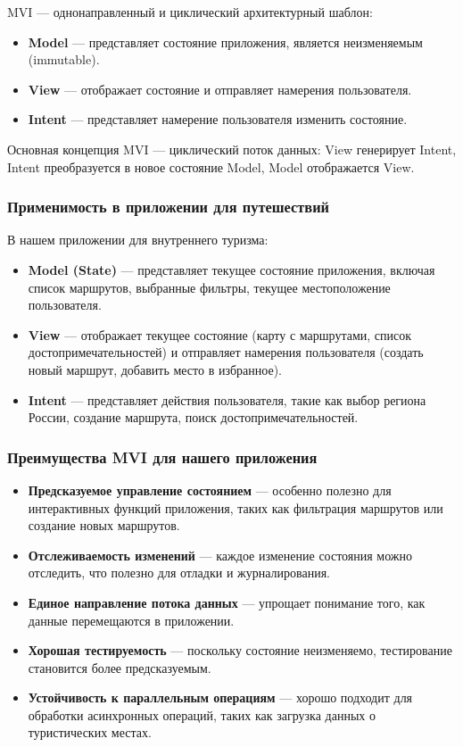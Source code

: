 MVI — однонаправленный и циклический архитектурный шаблон:

\begin{itemize}
    \item \textbf{Model} — представляет состояние приложения, является неизменяемым (immutable).
    \item \textbf{View} — отображает состояние и отправляет намерения пользователя.
    \item \textbf{Intent} — представляет намерение пользователя изменить состояние.
\end{itemize}

Основная концепция MVI — циклический поток данных: View генерирует Intent, Intent преобразуется в новое состояние Model, Model отображается View.



\subsubsection*{Применимость в приложении для путешествий}

В нашем приложении для внутреннего туризма:

\begin{itemize}
    \item \textbf{Model (State)} — представляет текущее состояние приложения, включая список маршрутов, выбранные фильтры, текущее местоположение пользователя.
    \item \textbf{View} — отображает текущее состояние (карту с маршрутами, список достопримечательностей) и отправляет намерения пользователя (создать новый маршрут, добавить место в избранное).
    \item \textbf{Intent} — представляет действия пользователя, такие как выбор региона России, создание маршрута, поиск достопримечательностей.
\end{itemize}

\subsubsection*{Преимущества MVI для нашего приложения}
\begin{itemize}
    \item \textbf{Предсказуемое управление состоянием} — особенно полезно для интерактивных функций приложения, таких как фильтрация маршрутов или создание новых маршрутов.
    \item \textbf{Отслеживаемость изменений} — каждое изменение состояния можно отследить, что полезно для отладки и журналирования.
    \item \textbf{Единое направление потока данных} — упрощает понимание того, как данные перемещаются в приложении.
    \item \textbf{Хорошая тестируемость} — поскольку состояние неизменяемо, тестирование становится более предсказуемым.
    \item \textbf{Устойчивость к параллельным операциям} — хорошо подходит для обработки асинхронных операций, таких как загрузка данных о туристических местах.
\end{itemize}

